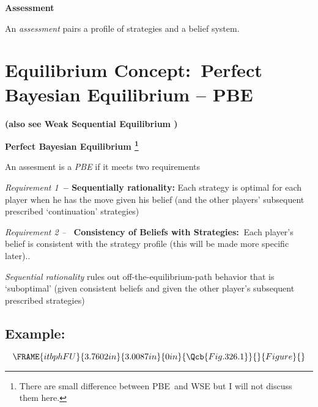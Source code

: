 \documentclass{article}
\begin{document}
\bigskip

\textbf{Assessment}

An \textit{assessment} pairs a profile of strategies and a belief system.

\bigskip

\section{Equilibrium Concept:\ Perfect Bayesian Equilibrium -- PBE}

\textbf{(also see Weak Sequential Equilibrium )}

\bigskip

\textbf{Perfect Bayesian Equilibrium \footnote{%
There are small difference between PBE\ and WSE but I will not discuss them
here.}}

An assesment is a \textit{PBE }if it meets two requirements

\bigskip

\textit{Requirement 1}\textbf{\ -- Sequentially rationality:} Each strategy
is optimal for each player when he has the move given his belief (and the
other players' subsequent prescribed `continuation' strategies)

\bigskip

\textit{Requirement 2 -- }\textbf{\ Consistency of Beliefs with Strategies: }%
$\ $Each player's belief is consistent with the strategy profile (this will
be made more specific later)..

\bigskip

\textit{Sequential rationality} rules out off-the-equilibrium-path behavior
that is `suboptimal' (given consistent beliefs and given the other player's
subsequent prescribed strategies)

\bigskip

\subsection{Example:}

\begin{equation}
\FRAME{itbphFU}{3.7602in}{3.0087in}{0in}{\Qcb{Fig. 326.1}}{}{Figure}{\special%
{language "Scientific Word";type "GRAPHIC";maintain-aspect-ratio
TRUE;display "USEDEF";valid_file "T";width 3.7602in;height 3.0087in;depth
0in;original-width 5.3599in;original-height 4.4317in;cropleft "0";croptop
"1";cropright "1";cropbottom "0";tempfilename
'JSY1RZ0B.wmf';tempfile-properties "XPR";}}
\end{equation}
\end{document}
